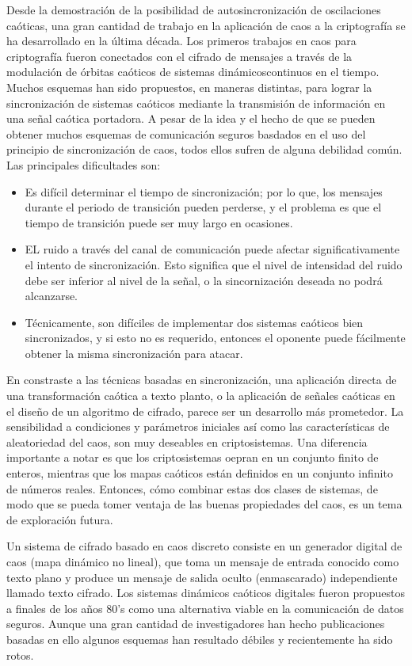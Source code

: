 \documentclass[10pt]{IEEEtran}
\begin{document}
Desde la demostración de la posibilidad de autosincronización de oscilaciones caóticas, una gran cantidad de trabajo en la aplicación de caos a la criptografía se ha desarrollado en la última década. Los primeros trabajos en caos para criptografía fueron conectados con el cifrado de mensajes a través de la modulación de órbitas caóticos de sistemas dinámicoscontinuos en el tiempo. Muchos esquemas han sido propuestos, en maneras distintas, para lograr la sincronización de sistemas caóticos mediante la transmisión de información en una señal caótica portadora.
A pesar de la idea y el hecho de que se pueden obtener muchos esquemas de comunicación seguros basdados en el uso del principio de sincronización de caos, todos ellos sufren de alguna debilidad común. Las principales dificultades son:
\begin{itemize}
\item Es difícil determinar el tiempo de sincronización; por lo que, los mensajes durante el periodo de transición pueden perderse, y el problema es que el tiempo de transición puede ser muy largo en ocasiones.
\item EL ruido a través del canal de comunicación puede afectar significativamente el intento de sincronización. Esto significa que el nivel de intensidad del ruido debe ser inferior al nivel de la señal, o la sincornización deseada no podrá alcanzarse.
\item Técnicamente, son difíciles de implementar dos sistemas caóticos bien sincronizados, y si esto no es requerido, entonces el oponente puede fácilmente obtener la misma sincronización para atacar.
\end{itemize}

En constraste a las técnicas basadas en sincronización, una aplicación directa de una transformación caótica a texto planto, o la aplicación de señales caóticas en el diseño de un algoritmo de cifrado, parece ser un desarrollo más prometedor. La sensibilidad a condiciones y parámetros iniciales así como las características de aleatoriedad del caos, son muy deseables en criptosistemas. Una diferencia importante a notar es que los criptosistemas oepran en un conjunto finito de enteros, mientras que los mapas caóticos están definidos en un conjunto infinito de números reales. Entonces, cómo combinar estas dos clases de sistemas, de modo que se pueda tomer ventaja de las buenas propiedades del caos, es un tema de exploración futura.

Un sistema de cifrado basado en caos discreto consiste en un generador digital de caos (mapa dinámico no lineal), que toma un mensaje de entrada conocido como texto plano y produce un mensaje de salida oculto (enmascarado) independiente llamado texto cifrado. Los sistemas dinámicos caóticos digitales fueron propuestos a finales de los años 80's como una alternativa viable en la comunicación de datos seguros. Aunque una gran cantidad de investigadores han hecho publicaciones basadas en ello algunos esquemas han resultado débiles y recientemente ha sido rotos.
\end{document}
